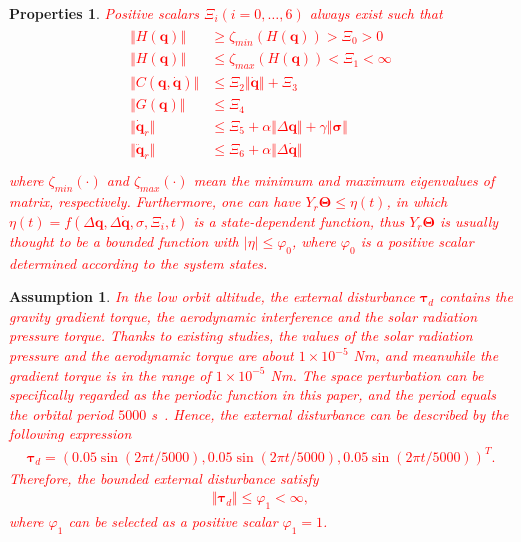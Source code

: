 \documentclass[3p]{elsarticle}
\theoremstyle{plain}
\newtheorem{myas}{Assumption}
\newtheorem{mypro}{Properties}
\theoremstyle{remark}
\begin{document}
\begin{mypro}\cite{parra2003dynamic}\label{pro:1}
\textcolor{red}{Positive scalars $\Xi_i(i = 0,\ldots,6)$ always exist such that
\begin{align}
\begin{split}
\Vert H(\bm q)\Vert & \ge \zeta_{min}(H(\bm q))>\Xi_0>0\\
\Vert H(\bm q)\Vert & \le \zeta_{max}(H(\bm q))<\Xi_1<\infty\\
\Vert C(\bm q,\dot {\bm q})\Vert & \le \Xi_2\Vert\dot {\bm q}\Vert+\Xi_3\\
\Vert G(\bm q)\Vert & \le \Xi_4\\
\Vert \dot {\bm q}_r\Vert & \le \Xi_5+\alpha\Vert\Delta \bm q\Vert+\gamma\Vert\bm\sigma\Vert\\
\Vert \ddot {\bm q}_r\Vert & \le \Xi_6+\alpha\Vert\Delta \dot {\bm q}\Vert\\
\end{split}
\end{align}
where $\zeta_{min}(\cdot)$ and $\zeta_{max}(\cdot)$ mean the minimum and maximum eigenvalues of matrix, respectively. Furthermore, one can have $Y_r\bm\Theta\le \eta(t)$, in which $\eta(t)=f(\Delta \bm q,\Delta \dot {\bm q},\sigma,\Xi_i,t)$ is a state-dependent function, thus $Y_r\bm\Theta$ is usually thought to be a bounded function with $\vert\eta\vert\le\varphi_0$, where $\varphi_0$ is a positive scalar determined according to the system states.}
\end{mypro}

\begin{myas}
\textcolor{red}{
In the low orbit altitude, the external disturbance $\bm\tau_d$ contains the gravity gradient torque, the aerodynamic interference and the solar radiation pressure torque. Thanks to existing studies, the values of the solar radiation pressure and the aerodynamic torque are about $1\times10^{-5}$ Nm, and meanwhile the gradient torque is in the range of $1\times10^{-5}$ Nm. The space perturbation can be specifically regarded as the periodic function in this paper, and the period equals the orbital period $5000$ s~\cite{Inamori2015192}. Hence, the external disturbance can be described by the following expression
\begin{align}
\bm\tau_d=\left(0.05\sin(2\pi t/5000),0.05\sin(2\pi t/5000),0.05\sin(2\pi t/5000)\right)^T.
\end{align}
Therefore, the bounded external disturbance satisfy
\begin{align}
\Vert\bm\tau_d\Vert\le\varphi_1<\infty,
\end{align}
where $\varphi_1$ can be selected as a positive scalar $\varphi_1=1$.
}
\end{myas}
\end{document}
